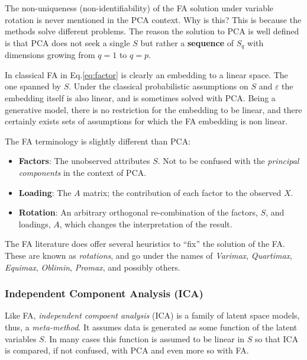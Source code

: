 \documentclass[]{book}
\providecommand{\tightlist}{%
  \setlength{\itemsep}{0pt}\setlength{\parskip}{0pt}}
\theoremstyle{definition}
\theoremstyle{definition}
\theoremstyle{remark}
\let\BeginKnitrBlock\begin \let\EndKnitrBlock\end
\begin{document}
\BeginKnitrBlock{remark}
The non-uniqueness (non-identifiability) of the
FA solution under variable rotation is never mentioned in the PCA
context. Why is this? This is because the methods solve different
problems. The reason the solution to PCA is well defined is that PCA
does not seek a single \(S\) but rather a \textbf{sequence} of \(S_q\)
with dimensions growing from \(q=1\) to \(q=p\).
\EndKnitrBlock{remark}

\BeginKnitrBlock{remark}
In classical FA in Eq.\eqref{eq:factor} is clearly
an embedding to a linear space. The one spanned by \(S\). Under the
classical probabilistic assumptions on \(S\) and \(\varepsilon\) the
embedding itself is also linear, and is sometimes solved with PCA. Being
a generative model, there is no restriction for the embedding to be
linear, and there certainly exists sets of assumptions for which the FA
embedding is non linear.
\EndKnitrBlock{remark}

The FA terminology is slightly different than PCA:

\begin{itemize}
\tightlist
\item
  \textbf{Factors}: The unobserved attributes \(S\). Not to be confused
  with the \emph{principal components} in the context of PCA.
\item
  \textbf{Loading}: The \(A\) matrix; the contribution of each factor to
  the observed \(X\).
\item
  \textbf{Rotation}: An arbitrary orthogonal re-combination of the
  factors, \(S\), and loadings, \(A\), which changes the interpretation
  of the result.
\end{itemize}

The FA literature does offer several heuristics to ``fix'' the solution
of the FA. These are known as \emph{rotations}, and go under the names
of \emph{Varimax}, \emph{Quartimax}, \emph{Equimax}, \emph{Oblimin},
\emph{Promax}, and possibly others.

\subsubsection{Independent Component Analysis
(ICA)}\label{independent-component-analysis-ica}

Like FA, \emph{independent compoent analysis} (ICA) is a family of
latent space models, thus, a \emph{meta-method}. It assumes data is
generated as some function of the latent variables \(S\). In many cases
this function is assumed to be linear in \(S\) so that ICA is compared,
if not confused, with PCA and even more so with FA.
\end{document}
